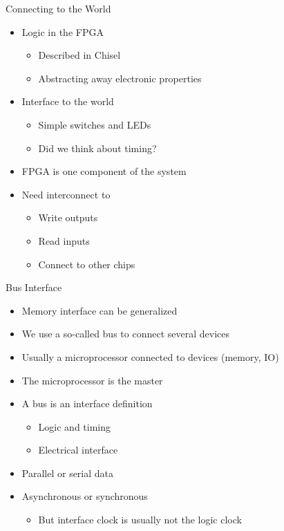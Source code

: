 \begin{frame}[fragile]{Connecting to the World}
\begin{itemize}
\item Logic in the FPGA
\begin{itemize}
\item Described in Chisel
\item Abstracting away electronic properties
\end{itemize}
\item Interface to the world
\begin{itemize}
\item Simple switches and LEDs
\item Did we think about timing?
\end{itemize}
\item FPGA is one component of the system
\item Need interconnect to
\begin{itemize}
\item Write outputs
\item Read inputs
\item Connect to other chips
\end{itemize}
\end{itemize}
\end{frame}

\begin{frame}[fragile]{Bus Interface}
\begin{itemize}
\item Memory interface can be generalized
\item We use a so-called bus to connect several devices
\item Usually a microprocessor connected to devices (memory, IO)
\item The microprocessor is the master
\item A bus is an interface definition
\begin{itemize}
\item Logic and timing
\item Electrical interface
\end{itemize}
\item Parallel or serial data
\item Asynchronous or synchronous
\begin{itemize}
\item But interface clock is usually not the logic clock
\end{itemize}
\end{itemize}
\end{frame}

